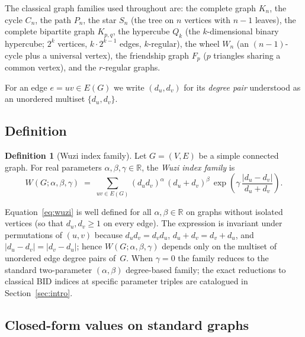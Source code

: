 \documentclass[a5paper, 10pt]{article}
\theoremstyle{plain}
\theoremstyle{remark}
\theoremstyle{definition}
\newtheorem{definition}{Definition}
\newcommand{\Wuzi}{W(G;\alpha,\beta,\gamma)}
\begin{document}
The classical graph families used throughout are: the complete
graph $K_n$, the cycle $C_n$, the path $P_n$, the star $S_n$
(the tree on $n$ vertices with $n - 1$ leaves), the complete
bipartite graph $K_{p,q}$, the hypercube $Q_k$ (the
$k$-dimensional binary hypercube; $2^k$ vertices,
$k \cdot 2^{k - 1}$ edges, $k$-regular), the wheel $W_n$ (an
$(n - 1)$-cycle plus a universal vertex), the friendship graph
$F_p$ ($p$ triangles sharing a common vertex), and the
$r$-regular graphs.

For an edge $e = uv \in E(G)$ we write $(d_u, d_v)$ for its
\emph{degree pair} understood as an unordered multiset
$\{d_u, d_v\}$.

\subsection{Definition}\label{sec:def}

\begin{definition}[Wuzi index family]\label{def:wuzi}
Let $G = (V, E)$ be a simple connected graph. For real parameters
$\alpha, \beta, \gamma \in \mathbb{R}$, the \emph{Wuzi index family}
is
\begin{equation}\label{eq:wuzi}
\Wuzi
\;=\; \sum_{uv \in E(G)}
(d_u d_v)^{\alpha}\,(d_u + d_v)^{\beta}\,
\exp\!\left(\gamma\,\frac{|d_u - d_v|}{d_u + d_v}\right).
\end{equation}
\end{definition}

Equation~\eqref{eq:wuzi} is well defined for all
$\alpha, \beta \in \mathbb{R}$ on graphs without isolated vertices
(so that $d_u, d_v \ge 1$ on every edge). The expression is
invariant under permutations of $(u, v)$ because
$d_u d_v = d_v d_u$, $d_u + d_v = d_v + d_u$, and
$|d_u - d_v| = |d_v - d_u|$; hence $\Wuzi$ depends only on the
multiset of unordered edge degree pairs of~$G$. When $\gamma = 0$
the family reduces to the standard two-parameter
$(\alpha, \beta)$ degree-based family; the exact reductions to
classical BID indices at specific parameter triples are
catalogued in Section~\ref{sec:intro}.

\subsection{Closed-form values on standard graphs}\label{sec:closedforms}
\end{document}
